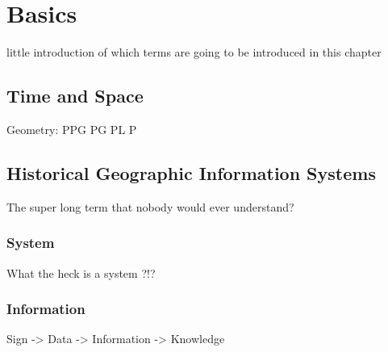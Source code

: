 
\section{Basics} %
\label{sec:basics}

little introduction of which terms are going to be introduced in this chapter



\subsection{Time and Space} %
\label{sub:time_and_space}



Geometry:
PPG
PG
PL
P




\subsection{Historical Geographic Information Systems} %
\label{sub:historical_geographic_information_systems}

The super long term that nobody would ever understand?


\subsubsection{System} %
\label{ssub:system}

What the heck is a system ?!?



\subsubsection{Information} %
\label{ssub:information}

Sign -> Data -> Information -> Knowledge



